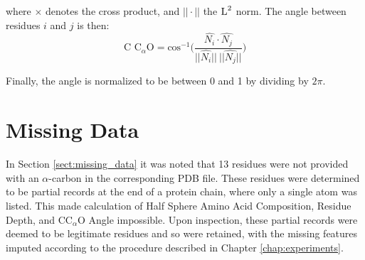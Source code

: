 \noindent
where $\times$ denotes the cross product, and $ || \cdot || $ the $\textsc{L}^2$ norm.
The angle between residues $i$ and $j$ is then:
\begin{equation}
\text{C C}_{\alpha} \text{O} = \text{cos}^{-1}\bigg(\frac{\hat{N_i} \cdot \hat{N_j}}{|| \hat{N_i} ||~|| \hat{N_j} || } \bigg)
\end{equation}

\noindent
Finally, the angle is normalized to be between 0 and 1 by dividing by $2 \pi$. 



\section{Missing Data}
In Section \ref{sect:missing_data} it was noted that 13 residues were not provided with an $\alpha$-carbon in the corresponding PDB file. 
These residues were determined to be partial records at the end of a protein chain, where only a single atom was listed.
This made calculation of Half Sphere Amino Acid Composition, Residue Depth, and $\text{CC}_{\alpha} \text{O}$ Angle impossible.
Upon inspection, these partial records were deemed to be legitimate residues and so were retained, with the missing features imputed according to the procedure described in Chapter \ref{chap:experiments}.
